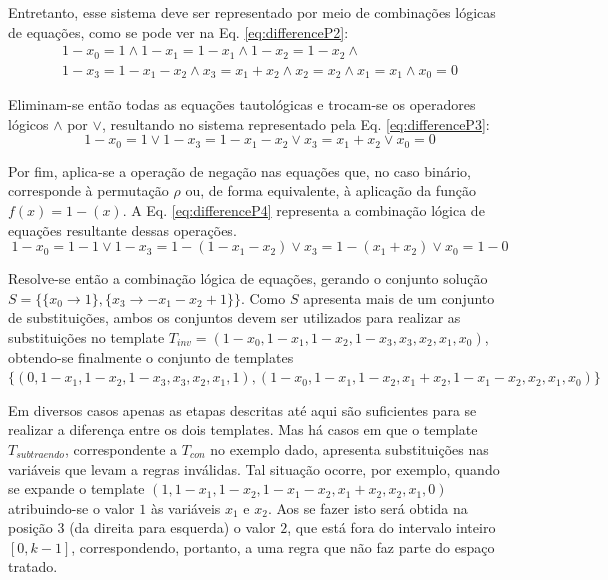 \documentclass[12pt, a4paper]{article}
\begin{document}
Entretanto, esse sistema deve ser representado por meio de combinações lógicas de equações, como se pode ver na Eq. \ref{eq:differenceP2}:
\begin{equation}
\begin{split}
1 - x_0	= 1				\wedge
1 - x_1	= 1 - x_1		\wedge
1 - x_2	= 1 - x_2		\wedge\\
1 - x_3	= 1 - x_1 - x_2	\wedge 
x_3		= x_1 + x_2		\wedge
x_2		= x_2			\wedge
x_1		= x_1			\wedge
x_0		= 0				
\label{eq:differenceP2}
\end{split}
\end{equation}

Eliminam-se então todas as equações tautológicas e trocam-se os operadores lógicos $\wedge$ por $\vee$, resultando no sistema representado pela Eq. \ref{eq:differenceP3}:
\begin{equation}
1 - x_0	= 1				\vee 
1 - x_3	= 1 - x_1 - x_2	\vee
x_3		= x_1 + x_2		\vee 
x_0		= 0				
\label{eq:differenceP3}
\end{equation}

Por fim, aplica-se a operação de negação nas equações que, no caso binário, corresponde à permutação $\rho $ ou,  de forma equivalente, à aplicação da função $f(x) = 1 - (x)$. A Eq. \eqref{eq:differenceP4} representa a combinação lógica de equações resultante dessas operações.
\begin{equation}
1 - x_0	= 1 - 1					\vee 
1 - x_3	= 1 - (1 - x_1 - x_2)	\vee
x_3		= 1 - (x_1 + x_2)		\vee 
x_0		= 1 - 0				
\label{eq:differenceP4}
\end{equation}

Resolve-se então a combinação lógica de equações, gerando o conjunto solução $S = \{\{x_0\to 1\},\{x_3\to -x_1-x_2+1\}\}$. Como $S$ apresenta mais de um conjunto de substituições, ambos os conjuntos devem ser utilizados para realizar as substituições no template $T_{inv} = (1 - x_0, 1 - x_1, 1 - x_2, 1 - x_3, x_3, x_2, x_1, x_0)$, obtendo-se finalmente o conjunto de templates $\{(0, 1 - x_1, 1 - x_2, 1 - x_3, x_3, x_2, x_1, 1),(1 - x_0, 1 - x_1, 1 - x_2, x_1 + x_2, 1 - x_1 - x_2, x_2, x_1, x_0)\}$

Em diversos casos apenas as etapas descritas até aqui são suficientes para se realizar a diferença entre os dois templates. Mas há casos em que o template $T_{subtraendo}$, correspondente a $T_{con}$ no exemplo dado, apresenta substituições nas variáveis que levam a regras inválidas. Tal situação ocorre, por exemplo, quando se expande o template $(1, 1 - x_1, 1 - x_2, 1 - x_1 - x_2, x_1 + x_2, x_2, x_1, 0)$ atribuindo-se o valor $1$ às variáveis $x_1$ e $x_2$. Aos se fazer isto será obtida na posição $3$ (da direita para esquerda) o valor $2$, que está fora do intervalo inteiro $[0,k-1]$, correspondendo, portanto, a uma regra que não faz parte do espaço tratado.
\end{document}
